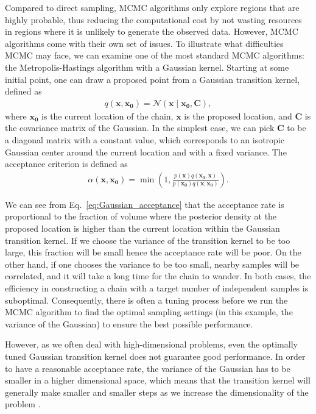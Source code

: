 \documentclass[twocolumn]{aastex631}
\begin{document}
Compared to direct sampling, MCMC algorithms only explore regions that are
highly probable, thus reducing the computational cost by not wasting resources
in regions where it is unlikely to generate the observed data. However, MCMC
algorithms come with their own set of issues. To illustrate what difficulties
MCMC may face, we can examine one of the most standard MCMC algorithms: the
Metropolis-Hastings algorithm with a Gaussian kernel. Starting at some initial
point, one can draw a proposed point from a Gaussian transition kernel, defined
as
\begin{align}
    q(\mathbf{x},\mathbf{x_0})= \mathcal{N}(\mathbf{x} \mid \mathbf{x_0},\mathbf{C}),
\end{align}
where $\mathbf{x_0}$ is the current location of the chain, $\mathbf{x}$ is the
proposed location, and $\mathbf{C}$ is the covariance matrix of the Gaussian. In
the simplest case, we can pick $\mathbf{C}$ to be a diagonal matrix with a
constant value, which corresponds to an isotropic Gaussian center around the
current location and with a fixed variance. The acceptance criterion is
defined as
\begin{align}
\alpha(\mathbf{x},\mathbf{x_0}) = \min\left(1,\frac{p(\mathbf{x})q(\mathbf{x_0},\mathbf{x})}{p(\mathbf{x_0})q(\mathbf{x},\mathbf{x_0})}\right).
\label{eq:Gaussian_acceptance}
\end{align}

We can see from Eq.~\eqref{eq:Gaussian_acceptance} that the acceptance rate is
proportional to the fraction of volume where the posterior density at the
proposed location is higher than the current location within the Gaussian
transition kernel. If we choose the variance of the transition kernel to be too
large, this fraction will be small hence the acceptance rate will be poor. On
the other hand, if one chooses the variance to be too small, nearby samples
will be correlated, and it will take a long time for the chain to wander. In
both cases, the efficiency in constructing a chain with a target number of
independent samples is suboptimal. Consequently, there is often a tuning
process before we run the MCMC algorithm to find the optimal sampling settings
(in this example, the variance of the Gaussian) to ensure the best possible
performance. 

However, as we often deal with high-dimensional problems, even the optimally
tuned Gaussian transition kernel does not guarantee good performance. In order
to have a reasonable acceptance rate, the variance of the Gaussian has to be
smaller in a higher dimensional space, which means that the transition kernel
will generally make smaller and smaller steps as we increase the dimensionality
of the problem \cite{2017arXiv170102434B}.
\end{document}
